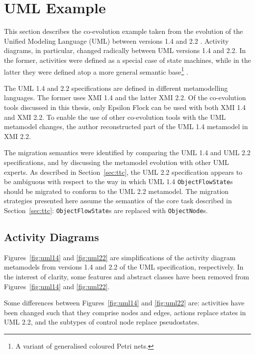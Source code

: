 \section{UML Example}
This section describes the co-evolution example taken from the evolution of the Unified Modeling Language (UML) between versions 1.4 \cite{uml14} and 2.2 \cite{uml22}. Activity diagrams, in particular, changed radically between UML versions 1.4 and 2.2. In the former, activities were defined as a special case of state machines, while in the latter they were defined atop a more general semantic base\footnote{A variant of generalised coloured Petri nets.} \cite{selic05uml2}.

The UML 1.4 and 2.2 specifications are defined in different metamodelling languages. The former uses XMI 1.4 and the latter XMI 2.2. Of the co-evolution tools discussed in this thesis, only Epsilon Flock can be used with both XMI 1.4 and XMI 2.2. To enable the use of other co-evolution tools with the UML metamodel changes, the author reconstructed part of the UML 1.4 metamodel in XMI 2.2.

The migration semantics were identified by comparing the UML 1.4 and UML 2.2 specifications, and by discussing the metamodel evolution with other UML experts. As described in Section~\ref{sec:ttc}, the UML 2.2 specification appears to be ambiguous with respect to the way in which UML 1.4 \texttt{ObjectFlowState}s should be migrated to conform to the UML 2.2 metamodel. The migration strategies presented here assume the semantics of the core task described in Section~\ref{sec:ttc}: \texttt{ObjectFlowState}s are replaced with \texttt{ObjectNode}s.

\subsection{Activity Diagrams}
Figures~\ref{fig:uml14} and \ref{fig:uml22} are simplifications of the activity diagram metamodels from versions 1.4 and 2.2 of the UML specification, respectively. In the interest of clarity, some features and abstract classes have been removed from Figures~\ref{fig:uml14} and \ref{fig:uml22}.


Some differences between Figures~\ref{fig:uml14} and \ref{fig:uml22} are: activities have been changed such that they comprise nodes and edges, actions replace states in UML 2.2, and the subtypes of control node replace pseudostates.

